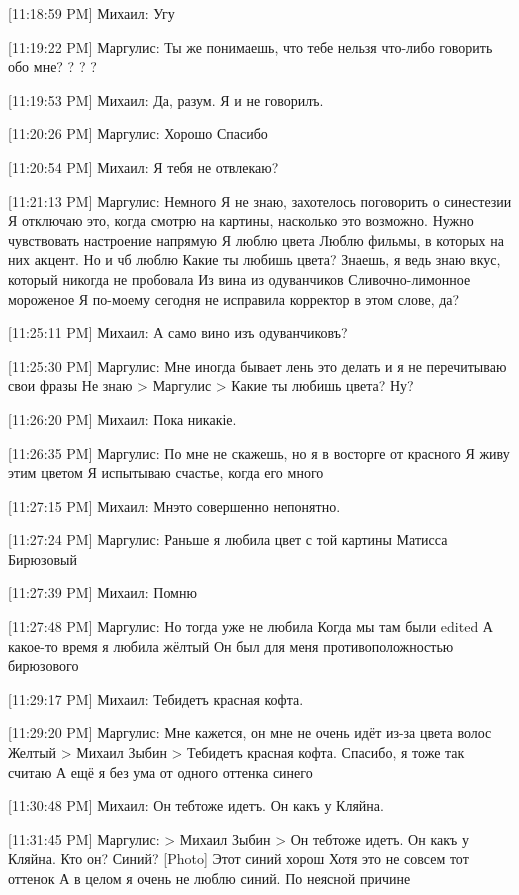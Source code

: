 \documentclass{article}
\newcommand{\yat}{{\fontencoding{X2}\selectfont\cyryat}} %
\begin{document}
{[11:18:59 PM] Михаил:
Угу

[11:19:22 PM] Маргулис:
Ты же понимаешь, что тебе нельзя что-либо говорить обо мне?
 ?
 ?
 ?

[11:19:53 PM] Михаил:
Да, разум. Я и не говорилъ.

[11:20:26 PM] Маргулис:
Хорошо
 Спасибо

[11:20:54 PM] Михаил:
Я тебя не отвлекаю?

[11:21:13 PM] Маргулис:
Немного
 Я не знаю, захотелось поговорить о синестезии
 Я отключаю это, когда смотрю на картины, насколько это возможно. Нужно чувствовать настроение напрямую
 Я люблю цвета
 Люблю фильмы, в которых на них акцент. Но и чб люблю
 Какие ты любишь цвета?
 Знаешь, я ведь знаю вкус, который никогда не пробовала
 Из вина из одуванчиков
 Сливочно-лимонное мороженое
 Я по-моему сегодня не исправила корректор в этом слове, да?

[11:25:11 PM] Михаил:
А само вино изъ одуванчиковъ?

[11:25:30 PM] Маргулис:
Мне иногда бывает лень это делать и я не перечитываю свои фразы
 Не знаю
> Маргулис
> Какие ты любишь цвета?
Ну?

[11:26:20 PM] Михаил:
Пока никакіе.

[11:26:35 PM] Маргулис:
По мне не скажешь, но я в восторге от красного
 Я живу этим цветом
 Я испытываю счастье, когда его много

[11:27:15 PM] Михаил:
Мн\yat это совершенно непонятно.

[11:27:24 PM] Маргулис:
Раньше я любила цвет с той картины Матисса
 Бирюзовый

[11:27:39 PM] Михаил:
Помню

[11:27:48 PM] Маргулис:
Но тогда уже не любила
 Когда мы там были
edited 
А какое-то время я любила жёлтый
 Он был для меня противоположностью бирюзового

[11:29:17 PM] Михаил:
Теб\yat идетъ красная кофта.

[11:29:20 PM] Маргулис:
Мне кажется, он мне не очень идёт из-за цвета волос
 Желтый
> Михаил Зыбин
> Теб\yat идетъ красная кофта.
Спасибо, я тоже так считаю
 А ещё я без ума от одного оттенка синего

[11:30:48 PM] Михаил:
Он теб\yat тоже идетъ. Он какъ у Кляйна.

[11:31:45 PM] Маргулис:
> Михаил Зыбин
> Он теб\yat тоже идетъ. Он какъ у Кляйна.
Кто он? Синий?
 [Photo]
 Этот синий хорош
 Хотя это не совсем тот оттенок
 А в целом я очень не люблю синий. По неясной причине

}
\end{document}
